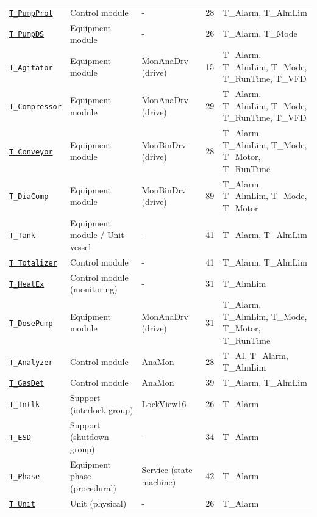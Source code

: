 \begin{small}
\begin{longtable}{@{}P{2.60cm}P{3.70cm}P{3.70cm}P{1.40cm}P{4.69cm}@{}}
\hyperref[sec:pclib-t-pumpprot]{\texttt{T\_PumpProt}} & Control module & - & 28 & T\_Alarm, T\_AlmLim \\
\hyperref[sec:pclib-t-pumpds]{\texttt{T\_PumpDS}} & Equipment module & - & 26 & T\_Alarm, T\_Mode \\
\hyperref[sec:pclib-t-agitator]{\texttt{T\_Agitator}} & Equipment module & MonAnaDrv (drive) & 15 & T\_Alarm, T\_AlmLim, T\_Mode, T\_RunTime, T\_VFD \\
\hyperref[sec:pclib-t-compressor]{\texttt{T\_Compressor}} & Equipment module & MonAnaDrv (drive) & 29 & T\_Alarm, T\_AlmLim, T\_Mode, T\_RunTime, T\_VFD \\
\hyperref[sec:pclib-t-conveyor]{\texttt{T\_Conveyor}} & Equipment module & MonBinDrv (drive) & 28 & T\_Alarm, T\_AlmLim, T\_Mode, T\_Motor, T\_RunTime \\
\hyperref[sec:pclib-t-diacomp]{\texttt{T\_DiaComp}} & Equipment module & MonBinDrv (drive) & 89 & T\_Alarm, T\_AlmLim, T\_Mode, T\_Motor \\
\hyperref[sec:pclib-t-tank]{\texttt{T\_Tank}} & Equipment module /\allowbreak{} Unit vessel & - & 41 & T\_Alarm, T\_AlmLim \\
\hyperref[sec:pclib-t-totalizer]{\texttt{T\_Totalizer}} & Control module & - & 41 & T\_Alarm, T\_AlmLim \\
\hyperref[sec:pclib-t-heatex]{\texttt{T\_HeatEx}} & Control module (monitoring) & - & 31 & T\_AlmLim \\
\hyperref[sec:pclib-t-dosepump]{\texttt{T\_DosePump}} & Equipment module & MonAnaDrv (drive) & 31 & T\_Alarm, T\_AlmLim, T\_Mode, T\_Motor, T\_RunTime \\
\hyperref[sec:pclib-t-analyzer]{\texttt{T\_Analyzer}} & Control module & AnaMon & 28 & T\_AI, T\_Alarm, T\_AlmLim \\
\hyperref[sec:pclib-t-gasdet]{\texttt{T\_GasDet}} & Control module & AnaMon & 39 & T\_Alarm, T\_AlmLim \\
\hyperref[sec:pclib-t-intlk]{\texttt{T\_Intlk}} & Support (interlock group) & LockView16 & 26 & T\_Alarm \\
\hyperref[sec:pclib-t-esd]{\texttt{T\_ESD}} & Support (shutdown group) & - & 34 & T\_Alarm \\
\hyperref[sec:pclib-t-phase]{\texttt{T\_Phase}} & Equipment phase (procedural) & Service (state machine) & 42 & T\_Alarm \\
\hyperref[sec:pclib-t-unit]{\texttt{T\_Unit}} & Unit (physical) & - & 26 & T\_Alarm \\
\bottomrule
\end{longtable}
\end{small}

